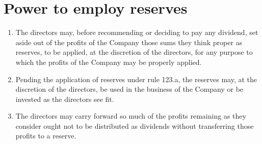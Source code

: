 \section{Power to employ reserves}

\begin{enumerate}[label=(\alph*)]
    \item The directors may, before recommending or deciding to pay any dividend, set aside out of the profits of the Company those sums they think proper as reserves, to be applied, at the discretion of the directors, for any purpose to which the profits of the Company may be properly applied.
    
    \item Pending the application of reserves under rule 123.a, the reserves may, at the discretion of the directors, be used in the business of the Company or be invested as the directors see fit.
    
    \item The directors may carry forward so much of the profits remaining as they consider ought not to be distributed as dividends without transferring those profits to a reserve.
\end{enumerate} 